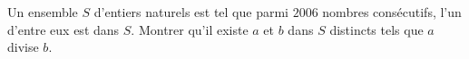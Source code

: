 Un ensemble $S$ d'entiers naturels est tel que parmi $2006$ nombres consécutifs, l'un d'entre eux est dans $S$. Montrer qu'il existe $a$ et $b$ dans $S$ distincts tels que $a$ divise $b$.
